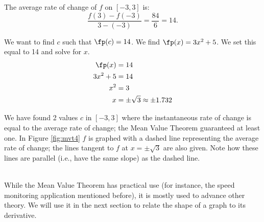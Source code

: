 {The average rate of change of $f$ on $[-3,3]$ is:
\[
\frac{f(3)-f(-3)}{3-(-3)} = \frac{84}{6} = 14.
\]
		
We want to find $c$ such that $\fp(c) = 14$. We find $\fp(x) = 3x^2+5$. We set this equal to 14 and solve for $x$. 
		\begin{align*}
		\fp(x) &= 14 \\
		3x^2 +5 &= 14\\
		x^2  &= 3\\
		x &= \pm \sqrt{3} \approx \pm 1.732
		\end{align*}
		
We have found 2 values $c$ in $[-3,3]$ where the instantaneous rate of change is equal to the average rate of change; the Mean Value Theorem guaranteed at least one. In Figure \ref{fig:mvt4} $f$ is graphed with a dashed line representing the average rate of change; the lines tangent to $f$ at $x=\pm \sqrt{3}$ are also given. Note how these lines are parallel (i.e., have the same slope) as the dashed line.
}\\

While the Mean Value Theorem has practical use (for instance, the speed monitoring application mentioned before), it is mostly used to advance other theory. We will use it in the next section to relate  the shape of a graph to its derivative.\\

%

